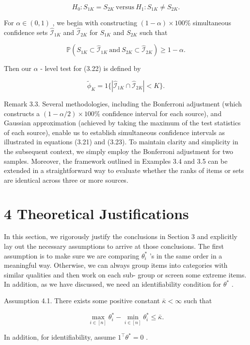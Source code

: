 \[
H_{0}:S_{1K} = S_{2K}\mathrm{~versus~}H_{1}:S_{1K}\neq S_{2K}. \tag{3.22}
\]

For \(\alpha \in (0,1)\) , we begin with constructing
\((1 - \alpha)\times 100\%\) simultaneous confidence sets
\(\widehat{\mathcal{I}}_{1K}\) and \(\widehat{\mathcal{I}}_{2K}\) for
\(S_{1K}\) and \(S_{2K}\) such that

\[
\mathbb{P}\left(S_{1K}\subset \widehat{\mathcal{I}}_{1K}\mathrm{~and~}S_{2K}\subset \widehat{\mathcal{I}}_{2K}\right)\geq 1 - \alpha . \tag{3.23}
\]

Then our \(\alpha\) - level test for (3.22) is defined by

\[
\widetilde{\phi}_{K} = 1\{|\widehat{\mathcal{I}}_{1K}\cap \widehat{\mathcal{I}}_{2K}|< K\} .
\]

Remark 3.3. Several methodologies, including the Bonferroni adjustment
(which constructs a \((1 - \alpha /2)\times 100\%\) confidence interval
for each source), and Gaussian approximation (achieved by taking the
maximum of the test statistics of each source), enable us to establish
simultaneous confidence intervals as illustrated in equations (3.21) and
(3.23). To maintain clarity and simplicity in the subsequent context, we
simply employ the Bonferroni adjustment for two samples. Moreover, the
framework outlined in Examples 3.4 and 3.5 can be extended in a
straightforward way to evaluate whether the ranks of items or sets are
identical across three or more sources.

\section{4 Theoretical Justifications}\label{theoretical-justifications}

In this section, we rigorously justify the conclusions in Section 3 and
explicitly lay out the necessary assumptions to arrive at those
conclusions. The first assumption is to make sure we are comparing
\(\theta_{i}^{*}\) 's in the same order in a meaningful way. Otherwise,
we can always group items into categories with similar qualities and
then work on each sub- group or screen some extreme items. In addition,
as we have discussed, we need an identifiability condition for
\(\theta^{*}\) .

Assumption 4.1. There exists some positive constant
\(\bar{\kappa} < \infty\) such that

\[
\max_{i\in [n]}\theta_{i}^{*} - \min_{i\in [n]}\theta_{i}^{*}\leq \bar{\kappa}.
\]

In addition, for identifiability, assume \(1^{\top}\theta^{*} = 0\) .

